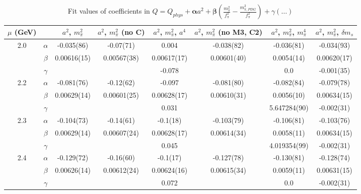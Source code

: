 \documentclass[12pt]{extarticle}
\begin{document}
\begin{table}[h!]
\begin{center}
\begin{tabular}{|c c|c|c|c|c|c|c|}
\hline
$\mu$ (GeV) &  & $a^2$, $m_\pi^2$& $a^2$, $m_\pi^2$ (no C)& $a^2$, $m_\pi^2$, $a^4$& $a^2$, $m_\pi^2$ (no M3, C2)& $a^2$, $m_\pi^2$, $m_\pi^4$& $a^2$, $m_\pi^2$, $\delta m_s$\\
\hline
\multirow{3}{0.5in}{2.0} & $\alpha$ & -0.035(86)& -0.07(71)& 0.004& -0.038(82)& -0.036(81)& -0.034(93)\\
 & $\beta$ & 0.00616(15)& 0.00567(38)& 0.00617(17)& 0.00601(40)& 0.0054(14)& 0.00620(17)\\
 & $\gamma$ &  &  & -0.078&  & 0.0& -0.001(35)\\
\hline
\multirow{3}{0.5in}{2.2} & $\alpha$ & -0.081(76)& -0.12(62)& -0.097& -0.081(80)& -0.082(84)& -0.079(78)\\
 & $\beta$ & 0.00629(14)& 0.00601(25)& 0.00628(17)& 0.00610(31)& 0.0056(10)& 0.00634(15)\\
 & $\gamma$ &  &  & 0.031&  & 5.647284(90)& -0.002(31)\\
\hline
\multirow{3}{0.5in}{2.3} & $\alpha$ & -0.104(73)& -0.14(61)& -0.1(18)& -0.103(79)& -0.106(81)& -0.103(76)\\
 & $\beta$ & 0.00629(14)& 0.00607(24)& 0.00628(17)& 0.00614(34)& 0.0058(11)& 0.00634(15)\\
 & $\gamma$ &  &  & 0.045&  & 4.019354(99)& -0.002(31)\\
\hline
\multirow{3}{0.5in}{2.4} & $\alpha$ & -0.129(72)& -0.16(60)& -0.1(17)& -0.127(78)& -0.130(81)& -0.128(74)\\
 & $\beta$ & 0.00626(14)& 0.00612(24)& 0.00624(16)& 0.00615(34)& 0.0059(11)& 0.00631(15)\\
 & $\gamma$ &  &  & 0.072&  & 0.0& -0.002(31)\\
\hline
\end{tabular}
\caption{Fit values of coefficients in $Q = Q_{phys} + \mathbf{\alpha} a^2 + \mathbf{\beta}\left(\frac{m_\pi^2}{f_\pi^2}-\frac{m_{\pi,PDG}^2}{f_\pi^2}\right) + \gamma(\ldots)$}
\end{center}
\end{table}







\end{document}
